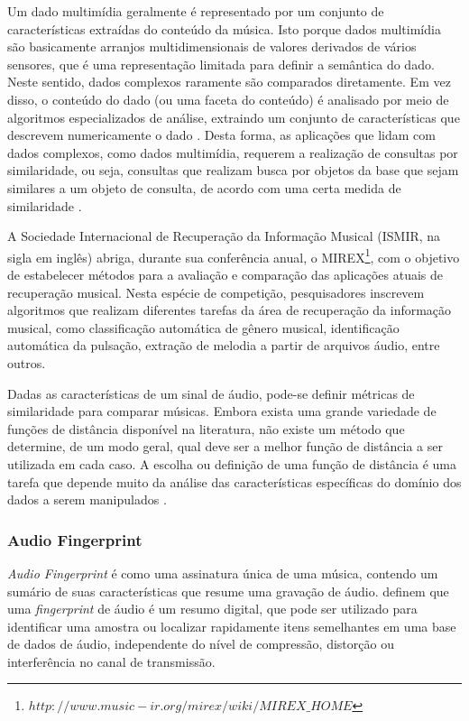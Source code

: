 Um dado multimídia geralmente é representado por um conjunto de características extraídas do conteúdo da música. Isto porque dados multimídia são basicamente arranjos multidimensionais de valores derivados de vários sensores, que é uma representação limitada para definir a semântica do dado. Neste sentido, dados complexos raramente são comparados diretamente. Em vez disso, o conteúdo do dado (ou uma faceta do conteúdo) é analisado por meio de algoritmos especializados de análise, extraindo um conjunto de características que descrevem numericamente o dado \cite{kaster2012}. Desta forma, as aplicações que lidam com dados complexos, como dados multimídia, requerem a realização de consultas por similaridade, ou seja, consultas que realizam busca por objetos da base que sejam similares a um objeto de consulta, de acordo com uma certa medida de similaridade \cite{barioni2006}.

A Sociedade Internacional de Recuperação da Informação Musical (ISMIR, na sigla em inglês) abriga, durante sua conferência anual, o MIREX\footnote{$http://www.music-ir.org/mirex/wiki/MIREX\_HOME$}, com o objetivo de estabelecer métodos para a avaliação e comparação das aplicações atuais de recuperação musical. Nesta espécie de competição, pesquisadores inscrevem algoritmos que realizam diferentes tarefas da área de recuperação da informação musical, como classificação automática de gênero musical, identificação automática da pulsação, extração de melodia a partir de arquivos áudio, entre outros.

Dadas as características de um sinal de áudio, pode-se definir métricas de similaridade para comparar músicas. Embora exista uma grande variedade de funções de distância disponível na literatura, não existe um método que determine, de um modo geral, qual deve ser a melhor função de distância a ser utilizada em cada caso. A escolha ou definição de uma função de distância é uma tarefa que depende muito da análise das características específicas do domínio dos dados a serem manipulados \cite{barioni2006}.

\subsubsection{Audio Fingerprint} \label{audioFingerprint}
\textit{Audio Fingerprint} é como uma assinatura única de uma música, contendo um sumário de suas características que resume uma gravação de áudio.  definem que uma \textit{fingerprint} de áudio é um resumo digital, que pode ser utilizado para identificar uma amostra ou localizar rapidamente itens semelhantes em uma base de dados de áudio, independente do nível de compressão, distorção ou interferência no canal de transmissão.

